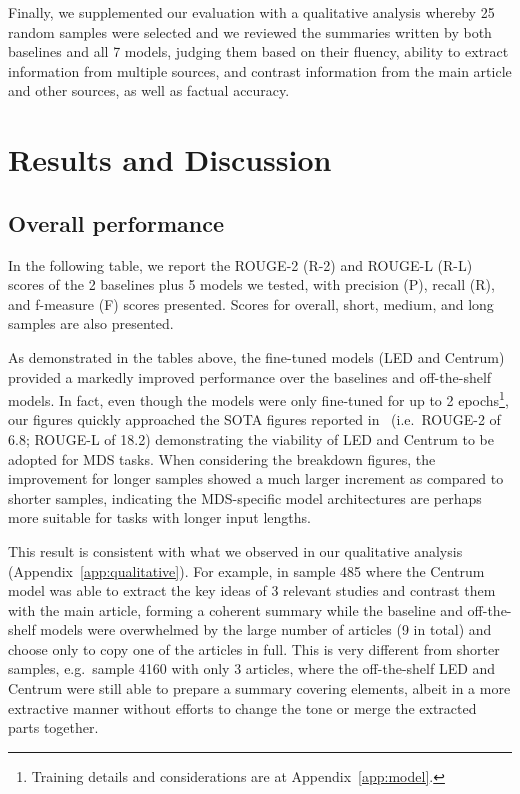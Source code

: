 \documentclass[12pt, twocolumn]{article}
\numberwithin{equation}{section}
\begin{document}
Finally, we supplemented our evaluation with a qualitative analysis whereby 25 random samples were selected and we reviewed the summaries written by both baselines and all 7 models, judging them based on their fluency, ability to extract information from multiple sources, and contrast information from the main article and other sources, as well as factual accuracy.

\section{Results and Discussion}
\label{sec:results}

\subsection{Overall performance}
\label{ssec:results-overall}

In the following table, we report the ROUGE-2 (R-2) and ROUGE-L (R-L) scores of the 2 baselines plus 5 models we tested, with precision (P), recall (R), and f-measure (F) scores presented.  Scores for overall, short, medium, and long samples are also presented.

As demonstrated in the tables above, the fine-tuned models (LED and Centrum) provided a markedly improved performance over the baselines and off-the-shelf models.  In fact, even though the models were only fine-tuned for up to 2 epochs\footnote{Training details and considerations are at Appendix~\ref{app:model}.}, our figures quickly approached the SOTA figures reported in~\cite{xiao2022primera} (i.e.~ROUGE-2 of 6.8; ROUGE-L of 18.2) demonstrating the viability of LED and Centrum to be adopted for MDS tasks.  When considering the breakdown figures, the improvement for longer samples showed a much larger increment as compared to shorter samples, indicating the MDS-specific model architectures are perhaps more suitable for tasks with longer input lengths.  

This result is consistent with what we observed in our qualitative analysis (Appendix~\ref{app:qualitative}).  For example, in sample 485 where the Centrum model was able to extract the key ideas of 3 relevant studies and contrast them with the main article, forming a coherent summary while the baseline and off-the-shelf models were overwhelmed by the large number of articles (9 in total) and choose only to copy one of the articles in full.  This is very different from shorter samples, e.g.~sample 4160 with only 3 articles, where the off-the-shelf LED and Centrum were still able to prepare a summary covering elements, albeit in a more extractive manner without efforts to change the tone or merge the extracted parts together.
\end{document}
